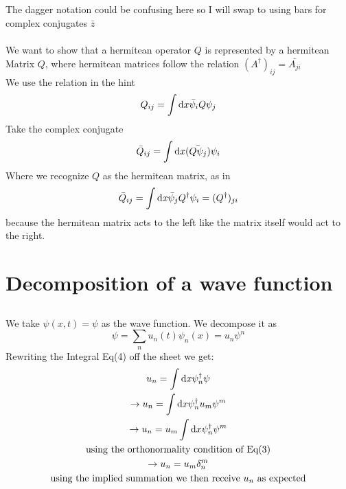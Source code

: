 \documentclass[]{scrartcl}
\begin{document}
\subsection{}
The dagger notation could be confusing here so I will swap to using bars for complex conjugates $\bar z$\\\\
We want to show that a hermitean operator $Q$ is represented by a hermitean Matrix $Q$, where hermitean matrices follow the relation $(A^\dagger)_{ij} = \bar{A_{ji}}$\\
We use the relation in the hint
\begin{gather}
	Q_{ij} = \int \text dx \bar\psi_i Q\psi_j
\end{gather}
Take the complex conjugate
\begin{gather}
	\bar{Q}_{ij}= \int \text dx \bar{(Q\psi_j)}\psi_i
\end{gather}
Where we recognize $Q$ as the hermitean matrix, as in
\begin{gather}
	\bar{Q}_{ij} = \int \text dx \bar\psi_j Q^\dagger \psi_i = (Q^\dagger)_{ji}
\end{gather}
because the hermitean matrix acts to the left like the matrix itself would act to the right.

\section{Decomposition of a wave function}

\subsection{}

We take $\psi(x,t) = \psi$ as the wave function. We decompose it as
\begin{equation}
	\psi = \sum_n u_n(t) \psi_n(x) = u_n \psi^n 
\end{equation}
Rewriting the Integral Eq(4) off the sheet we get:
\begin{gather}
	u_n = \int \text dx \psi_n^\dagger \psi\\
	\rightarrow u_n = \int \text dx \psi_n^\dagger u_m\psi^m\\
	\rightarrow u_n = u_m \int\text dx \psi_n^\dagger \psi^m\\
	\text{using the orthonormality condition of Eq(3)}\\
	\rightarrow u_n = u_m \delta_n^m\\
	\text{using the implied summation we then receive $u_n$ as expected}
\end{gather}
\end{document}
